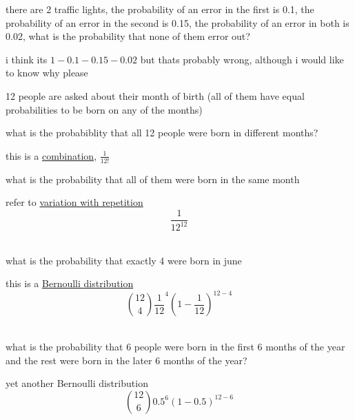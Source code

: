 \documentclass[a4paper,12pt]{article}
\begin{document}
\begin{question}
there are 2 traffic lights, the probability of an error in the first is 0.1, the probability of an error in the second is 0.15, the probability of an error in both is 0.02, what is the probability that none of them error out?\\
\begin{answer}
i think its \(1-0.1-0.15-0.02\) but thats probably wrong, although i would like to know why please\\
\end{answer}
\end{question}

\begin{question}
12 people are asked about their month of birth (all of them have equal probabilities to be born on any of the months)\\
\begin{subquestion}
what is the probabiblity that all 12 people were born in different months?\\
\begin{answer}
this is a \href{20221204105120-combinatorics.org}{combination}, \(\frac{1}{12!}\)\\
\end{answer}
\end{subquestion}
\begin{subquestion}
what is the probability that all of them were born in the same month\\
\begin{answer}
refer to \href{20221204105120-combinatorics.org}{variation with repetition}\\
\[
\frac{1}{12^{12}}
\]\\
\end{answer}
\end{subquestion}
\begin{subquestion}
what is the probability that exactly 4 were born in june\\
\begin{answer}
this is a \href{20230113174354-binomial_distribution.org}{Bernoulli distribution}\\
\[
\binom{12}{4} \frac{1}{12}^4\left(1-\frac{1}{12}\right)^{12-4}
\]\\
\end{answer}
\end{subquestion}
\begin{subquestion}
what is the probability that 6 people were born in the first 6 months of the year and the rest were born in the later 6 months of the year?\\
\begin{answer}
yet another Bernoulli distribution\\
\[
\binom{12}{6}0.5^6{(1-0.5)}^{12-6}
\]\\
\end{answer}
\end{subquestion}
\end{question}
\end{document}
